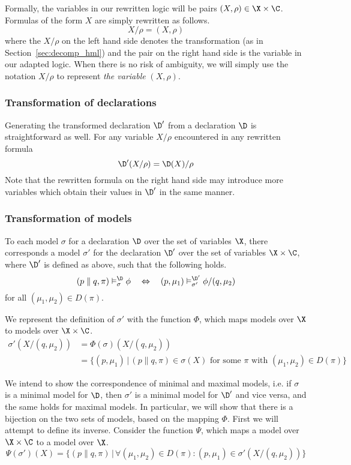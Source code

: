 Formally, the variables in our rewritten logic will be pairs $(X,\rho)\in \X\times\C$.
Formulas of the form $X$ are simply rewritten as follows.
\[
X/\rho = (X,\rho)
\]
where the $X/\rho$ on the left hand side denotes the transformation (as in
Section~\ref{sec:decomp_hml}) and the pair on the right hand side is the
variable in our adapted logic. When there is no risk of ambiguity, we will
simply use the notation $X/\rho$ to represent {\em the variable} $(X,\rho)$.

\subsubsection{Transformation of declarations}

Generating the transformed declaration $\D'$
from a declaration $\D$ is straightforward as well. For any variable $X/\rho$
encountered in any rewritten formula
\[
\D'(X/\rho) = \D(X)/\rho
\]
Note that the rewritten formula on the right hand side may introduce more variables
which obtain their values in $\D'$ in the same manner.

\subsubsection{Transformation of models}

To each model $\sigma$ for a declaration $\D$ over the set of variables $\X$,
there corresponds a model $\sigma'$ for the declaration $\D'$ over the set of
variables $\X\times\C$, where $\D'$ is defined as above, such that the following
holds.
\[
(p\parallel q, \pi) \vDash^\D_\sigma \phi
\quad \Leftrightarrow \quad
(p,\mu_1) \vDash^{\D'}_{\sigma'} \phi/(q,\mu_2)
\]
for all $(\mu_1,\mu_2)\in D(\pi)$.

We represent the definition of $\sigma'$ with the function $\Phi$, which
maps models over $\X$ to models over $\X\times\C$.
\begin{align*}
\sigma'(X/(q, \mu_2)) &= \Phi(\sigma)(X/(q, \mu_2))  \\
& = \{ (p, \mu_1) \,|\, (p\parallel q, \pi) \in \sigma(X) \textrm{ for some $\pi$ with }
(\mu_1,\mu_2) \in D(\pi) \}
\end{align*}

We intend to show the correspondence of minimal and maximal models, i.e. if $\sigma$
is a minimal model for $\D$, then $\sigma'$ is a minimal model for $\D'$ and vice versa,
and the same holds for maximal models. 
In particular, we will show that there is a bijection on the two sets of models, based
on the mapping $\Phi$. First we will attempt to define its inverse.
Consider the function $\Psi$,
which maps a model over $\X\times\C$ to a model over $\X$.
\[
\Psi(\sigma')(X) = \{ (p\parallel q, \pi) \,|\, 
\forall(\mu_1,\mu_2) \in D(\pi) :
(p,\mu_1) \in \sigma'(X/(q,\mu_2)) \}
\]

